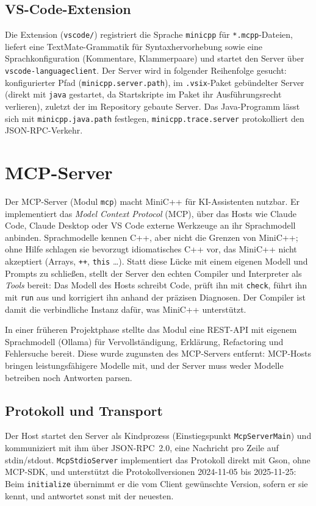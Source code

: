 \documentclass[11pt,a4paper,parskip=half,headsepline,toc=flat]{scrartcl}
\newcommand{\code}[1]{\texttt{#1}}
\begin{document}
\subsection{VS-Code-Extension}
Die Extension (\code{vscode/}) registriert die Sprache \code{minicpp} für \code{*.mcpp}-Dateien, liefert eine
TextMate-Grammatik für Syntaxhervorhebung sowie eine Sprachkonfiguration (Kommentare, Klammerpaare) und startet den
Server über \code{vscode-languageclient}. Der Server wird in folgender Reihenfolge gesucht: konfigurierter Pfad
(\code{minicpp.server.path}), im \code{.vsix}-Paket gebündelter Server (direkt mit \code{java} gestartet, da
Startskripte im Paket ihr Ausführungsrecht verlieren), zuletzt der im Repository gebaute Server. Das Java-Programm
lässt sich mit \code{minicpp.java.path} festlegen, \code{minicpp.trace.server} protokolliert den JSON-RPC-Verkehr.

\section{MCP-Server}\label{sec:mcp}
Der MCP-Server (Modul \code{mcp}) macht MiniC++ für KI-Assistenten nutzbar. Er implementiert das
\emph{Model Context Protocol} (MCP), über das Hosts wie Claude Code, Claude Desktop oder VS Code externe Werkzeuge an
ihr Sprachmodell anbinden. Sprachmodelle kennen C++, aber nicht die Grenzen von MiniC++; ohne Hilfe schlagen sie
bevorzugt idiomatisches C++ vor, das MiniC++ nicht akzeptiert (Arrays, \code{++}, \code{this} \dots). Statt diese
Lücke mit einem eigenen Modell und Prompts zu schließen, stellt der Server den echten Compiler und Interpreter als
\emph{Tools} bereit: Das Modell des Hosts schreibt Code, prüft ihn mit \code{check}, führt ihn mit \code{run} aus und
korrigiert ihn anhand der präzisen Diagnosen. Der Compiler ist damit die verbindliche Instanz dafür, was MiniC++
unterstützt.

\begin{hinweis}
In einer früheren Projektphase stellte das Modul eine REST-API mit eigenem Sprachmodell (Ollama) für Vervollständigung,
Erklärung, Refactoring und Fehlersuche bereit. Diese wurde zugunsten des MCP-Servers entfernt: MCP-Hosts bringen
leistungsfähigere Modelle mit, und der Server muss weder Modelle betreiben noch Antworten parsen.
\end{hinweis}

\subsection{Protokoll und Transport}
Der Host startet den Server als Kindprozess (Einstiegspunkt \code{McpServerMain}) und kommuniziert mit ihm über
JSON-RPC~2.0, eine Nachricht pro Zeile auf stdin/stdout. \code{McpStdioServer} implementiert das Protokoll direkt mit
Gson, ohne MCP-SDK, und unterstützt die Protokollversionen 2024-11-05 bis 2025-11-25: Beim \code{initialize}
übernimmt er die vom Client gewünschte Version, sofern er sie kennt, und antwortet sonst mit der neuesten.
\end{document}
